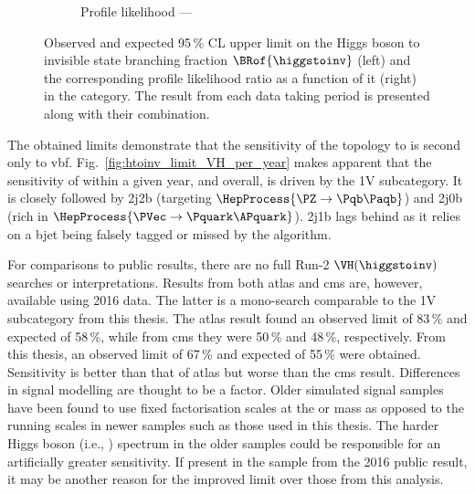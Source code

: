\begin{figure}[htbp]
\begin{subfigure}[t]{0.45\textwidth}
        \caption{Profile likelihood --- \VH}
    \end{subfigure}
    \caption[Observed and expected 95\,\% CL upper limit on the Higgs boson to invisible state branching fraction $\BRof{\higgstoinv}$ (left) and the corresponding profile likelihood ratio as a function of it (right) in the \VH category]{Observed and expected 95\,\% CL upper limit on the Higgs boson to invisible state branching fraction $\BRof{\higgstoinv}$ (left) and the corresponding profile likelihood ratio as a function of it (right) in the \VH category. The result from each data taking period is presented along with their combination.}
    \label{fig:htoinv_limit_VH}
\end{figure}

The obtained limits demonstrate that the sensitivity of the \VH topology to \higgstoinv is second only to \acrshort{vbf}. Fig.~\ref{fig:htoinv_limit_VH_per_year} makes apparent that the sensitivity of \VH within a given year, and overall, is driven by the 1V subcategory. It is closely followed by 2j2b (targeting $\HepProcess{\PZ \to \Pqb\Paqb}$) and 2j0b (rich in $\HepProcess{\PVec \to \Pquark\APquark}$). 2j1b lags behind as it relies on a \gls{bjet} being falsely tagged or missed by the \deepcsv algorithm.

For comparisons to public results, there are no full Run-2 $\VH(\higgstoinv)$ searches or interpretations. Results from both \acrshort{atlas} and \acrshort{cms} are, however, available using 2016 data. The latter is a mono-\PVec search comparable to the 1V subcategory from this thesis. The \acrshort{atlas} \VH result found an observed limit of 83\,\% and expected of 58\,\%, while from \acrshort{cms} they were 50\,\% and 48\,\%, respectively. From this thesis, an observed limit of 67\,\% and expected of 55\,\% were obtained. Sensitivity is better than that of \acrshort{atlas} but worse than the \acrshort{cms} result. Differences in signal modelling are thought to be a factor. Older simulated signal samples have been found to use fixed factorisation scales at the \PW or \PH mass as opposed to the running scales in newer samples such as those used in this thesis. The harder Higgs boson \pt (i.e., \ptmiss) spectrum in the older samples could be responsible for an artificially greater sensitivity. If present in the \ttH sample from the 2016 public result, it may be another reason for the improved limit over those from this analysis.



